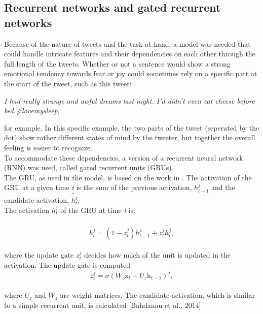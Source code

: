 \subsection{Recurrent networks and gated recurrent networks}
Because of the nature of tweets and the task at hand, a model was needed that could handle intricate features and their dependencies on each other through the full length of the tweets. Whether or not a sentence would show a strong emotional tendency towards fear or joy could sometimes rely on a specific part at the start of the tweet, such as this tweet:\\
\begin{center}
\textit{I had really strange and awful dreams last night. I'd didn't even eat cheese before bed  \#lovemysleep},\\
\end{center}
for example. In this specific example, the two parts of the tweet (seperated by the dot) show rather different states of mind by the tweeter, but together the overall feeling is easier to recognize.\\
To accommodate these dependencies, a version of a recurrent neural network (RNN) was used, called gated recurrent units (GRUs).
\\
The GRU, as used in the model, is based on the work in \cite{chung}. The activation of the GRU at a given time \textit{t} is the sum of the previous activation, $h_{t-1}^{j}$ and the candidate activation, $\tilde{h_{t}^{j}}$.\\
The activation $h_{t}^{j}$ of the GRU at time \textit{t} is:\\
\\
\begin{equation} \label{eq:activation}
h_{t}^{j} = \left(1 - z_{t}^{j}\right)h_{t-1}^{j}+z_{t}^{j}\tilde{h_{t}^{j}},
\end{equation}\\

where the update gate $z_{t}^{j}$ decides how much of the unit is updated in the activation. The update gate is computed\\

\begin{equation}\label{eq:update}
z_{t}^{j}=\sigma\left(W_{z}\mathrm{x}_{t}+U_{z}\mathrm{h}_{t-1}\right)^{j},
\end{equation}\\

where $U_{z}$ and $W_{z}$ are weight matrices. The candidate activation, which is similar to a simple recurrent unit, is calculated [Bahdanau et al., 2014]\\

